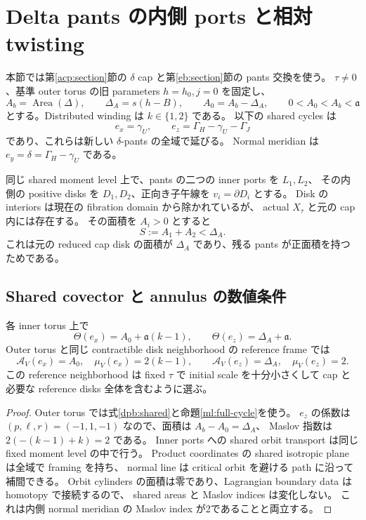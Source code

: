 \section{Delta pants の内側 ports と相対 twisting}
\label{dpb:section}

本節では第\ref{acp:section}節の $\delta$ cap と第\ref{eb:section}節の pants 交換を使う。
$\tau\ne0$、基準 outer torus の旧 parameters $h=h_0,j=0$ を固定し、
\[
 A_b=\operatorname{Area}(\Delta),\qquad
 \Delta_A=s(h-B),\qquad A_0=A_b-\Delta_A,
 \qquad 0<A_0<A_b<\mathfrak a
\]
とする。Distributed winding は $k\in\{1,2\}$ である。
以下の shared cycles は
\begin{equation}\label{dpb:shared}
 e_x=\gamma_U,\qquad
 e_z=\Gamma_H-\gamma_U-\Gamma_J
\end{equation}
であり、これらは新しい $\delta$-pants の全域で延びる。
Normal meridian は $e_y=\delta=\Gamma_H-\gamma_U$ である。

同じ shared moment level 上で、pants の二つの inner ports を $L_1,L_2$、
その内側の positive disks を $D_1,D_2$、正向き子午線を $v_i=\partial D_i$ とする。
Disk の interiors は現在の fibration domain から除かれているが、
actual $X_\tau$ と元の cap 内には存在する。
その面積を $A_i>0$ とすると
\begin{equation}\label{dpb:small}
 S:=A_1+A_2<\Delta_A.
\end{equation}
これは元の reduced cap disk の面積が $\Delta_A$ であり、残る pants が正面積を持つためである。

\subsection{Shared covector と annulus の数値条件}

\begin{proposition}\label{dpb:covector}
各 inner torus 上で
\begin{equation}\label{dpb:theta}
 \Theta(e_x)=A_0+\mathfrak a(k-1),\qquad
 \Theta(e_z)=\Delta_A+\mathfrak a.
\end{equation}
Outer torus と同じ contractible disk neighborhood の reference frame では
\[
 \mathcal A_V(e_x)=A_0,\quad \mu_V(e_x)=2(k-1),\qquad
 \mathcal A_V(e_z)=\Delta_A,\quad \mu_V(e_z)=2.
\]
この reference neighborhood は fixed $\tau$ で initial scale を十分小さくして
cap と必要な reference disks 全体を含むように選ぶ。
\end{proposition}

\begin{proof}
Outer torus では式\eqref{dpb:shared}と命題\ref{ml:full-cycle}を使う。
$e_z$ の係数は $(p,\ell,r)=(-1,1,-1)$ なので、面積は $A_b-A_0=\Delta_A$、
Maslov 指数は $2(-(k-1)+k)=2$ である。
Inner ports への shared orbit transport は同じ fixed moment level の中で行う。
Product coordinates の shared isotropic plane は全域で framing を持ち、
normal line は critical orbit を避ける path に沿って補間できる。
Orbit cylinders の面積は零であり、Lagrangian boundary data は homotopy で接続するので、
shared areas と Maslov indices は変化しない。
これは内側 normal meridian の Maslov index が2であることと両立する。
\end{proof}

